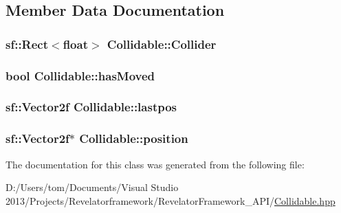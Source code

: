 \subsection{Member Data Documentation}
\hypertarget{class_collidable_a474de18f0027a4e089be1097f6d7bcc7}{
\subsubsection[{Collider}]{\setlength{\rightskip}{0pt plus 5cm}sf\-::\-Rect$<$float$>$ Collidable\-::\-Collider\hspace{0.3cm}{\ttfamily [protected]}}}\label{class_collidable_a474de18f0027a4e089be1097f6d7bcc7}
\hypertarget{class_collidable_afe5442fd3a82abe62b95e93248d5f4a1}{
\subsubsection[{has\-Moved}]{\setlength{\rightskip}{0pt plus 5cm}bool Collidable\-::has\-Moved\hspace{0.3cm}{\ttfamily [protected]}}}\label{class_collidable_afe5442fd3a82abe62b95e93248d5f4a1}
\hypertarget{class_collidable_ae50dbf8f9d1f584d3a5d5c3445fbe786}{
\subsubsection[{lastpos}]{\setlength{\rightskip}{0pt plus 5cm}sf\-::\-Vector2f Collidable\-::lastpos\hspace{0.3cm}{\ttfamily [protected]}}}\label{class_collidable_ae50dbf8f9d1f584d3a5d5c3445fbe786}
\hypertarget{class_collidable_aa6c2e113d920df8c0d5da2a244f924bd}{
\subsubsection[{position}]{\setlength{\rightskip}{0pt plus 5cm}sf\-::\-Vector2f$\ast$ Collidable\-::position\hspace{0.3cm}{\ttfamily [protected]}}}\label{class_collidable_aa6c2e113d920df8c0d5da2a244f924bd}


The documentation for this class was generated from the following file\-:\begin{DoxyCompactItemize}
\item 
D\-:/\-Users/tom/\-Documents/\-Visual Studio 2013/\-Projects/\-Revelatorframework/\-Revelator\-Framework\-\_\-\-A\-P\-I/\hyperlink{_collidable_8hpp}{Collidable.\-hpp}\end{DoxyCompactItemize}

